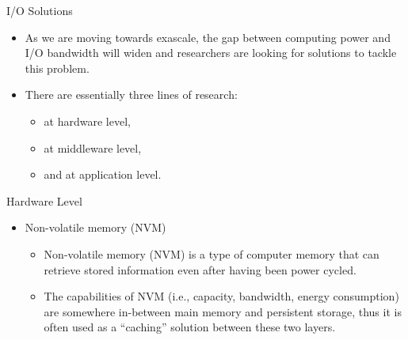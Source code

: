\documentclass[compress,11pt,xcolor=svgnames,aspectratio=169]{beamer}
\begin{document}
\begin{frame}[t]{I/O Solutions}

\begin{itemize}

\item As we are moving towards exascale, the gap between computing power and I/O bandwidth will
widen and researchers are looking for solutions to tackle this problem.\\[0.4cm]

\item There are essentially three lines of research:\\[0.4cm]

    \begin{itemize}
    \setlength\itemsep{0.6cm}

      \item at hardware level,
      \item at middleware level,
      \item and at application level.

    \end{itemize}

\end{itemize}

\end{frame}

\begin{frame}[t]{Hardware Level}

\begin{itemize}

    \item Non-volatile memory (NVM)\\[0.4cm]

    \begin{itemize}
    \setlength\itemsep{0.6cm}

        \item Non-volatile memory (NVM) is a type of computer memory that can retrieve stored information even after having been power cycled.

        \item The capabilities of NVM (i.e., capacity, bandwidth, energy consumption) are somewhere in-between main memory and persistent storage, thus it is often used as a ``caching'' solution between these two layers.

    \end{itemize}

\end{itemize}

\end{frame}
\end{document}
